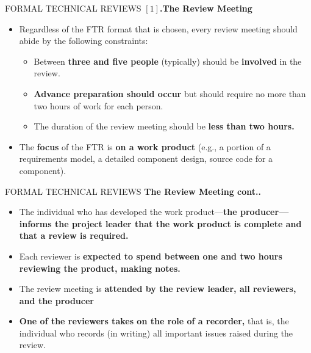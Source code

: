 \documentclass{beamer}
\begin{document}
\begin{frame}{FORMAL TECHNICAL REVIEWS}
	\textbf{$[1]$.The Review Meeting}
	\begin{itemize}
		\item Regardless of the FTR format that is chosen, every review meeting should abide 
		by the following constraints:
		\begin{itemize}
			\item Between \textbf{three and five people} (typically) should be \textbf{involved} in the 
			review.
			\item \textbf{Advance preparation should occur} but should require no more than 
			two hours of work for each person.
			\item The duration of the review meeting should be \textbf{less than two hours.}
		\end{itemize}
	\item The \textbf{focus }of the FTR is \textbf{on a work product} (e.g., a portion of a 
	requirements model, a detailed component design, source code for a 
	component).
	\end{itemize}
\end{frame}
\begin{frame}{FORMAL TECHNICAL REVIEWS}
	\textbf{The Review Meeting cont..}
	\begin{itemize}
		\item The individual who has developed the work product—\textbf{the producer—
			informs the project leader that the work product is complete and that 
			a review is required.}
		\item Each reviewer is \textbf{expected to spend between one and two hours 
			reviewing the product, making notes.}
		\item The review meeting is \textbf{attended by the review leader, all reviewers, 
			and the producer}
		\item \textbf{One of the reviewers takes on the role of a recorder,} that is, the 
		individual who records (in writing) all important issues raised during 
		the review.
	
	\end{itemize}
\end{frame}
\end{document}
